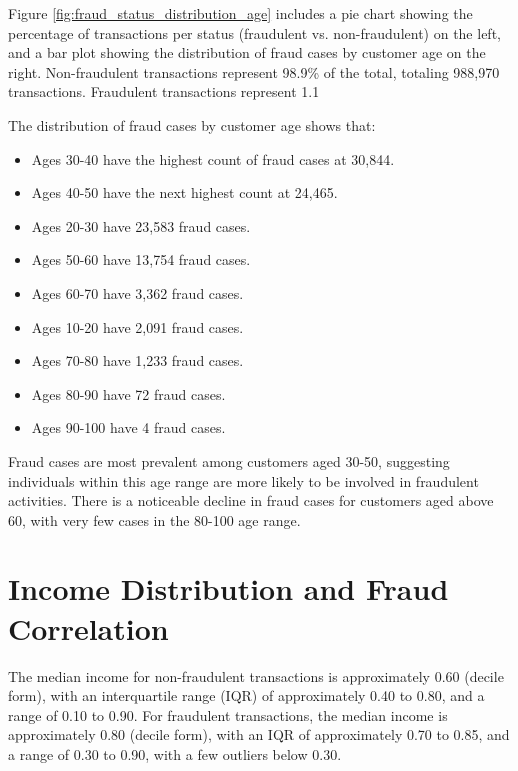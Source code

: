 \documentclass[12pt,a4paper]{report}
\begin{document}
Figure \ref{fig:fraud_status_distribution_age} includes a pie chart showing the percentage of transactions per status (fraudulent vs. non-fraudulent) on the left, and a bar plot showing the distribution of fraud cases by customer age on the right. Non-fraudulent transactions represent 98.9\% of the total, totaling 988,970 transactions. Fraudulent transactions represent 1.1%

The distribution of fraud cases by customer age shows that:

\begin{itemize}
    \item Ages 30-40 have the highest count of fraud cases at 30,844.
    \item Ages 40-50 have the next highest count at 24,465.
    \item Ages 20-30 have 23,583 fraud cases.
    \item Ages 50-60 have 13,754 fraud cases.
    \item Ages 60-70 have 3,362 fraud cases.
    \item Ages 10-20 have 2,091 fraud cases.
    \item Ages 70-80 have 1,233 fraud cases.
    \item Ages 80-90 have 72 fraud cases.
    \item Ages 90-100 have 4 fraud cases.
\end{itemize}

Fraud cases are most prevalent among customers aged 30-50, suggesting individuals within this age range are more likely to be involved in fraudulent activities. There is a noticeable decline in fraud cases for customers aged above 60, with very few cases in the 80-100 age range.

\section{Income Distribution and Fraud Correlation}

The median income for non-fraudulent transactions is approximately 0.60 (decile form), with an interquartile range (IQR) of approximately 0.40 to 0.80, and a range of 0.10 to 0.90. For fraudulent transactions, the median income is approximately 0.80 (decile form), with an IQR of approximately 0.70 to 0.85, and a range of 0.30 to 0.90, with a few outliers below 0.30.
\end{document}
